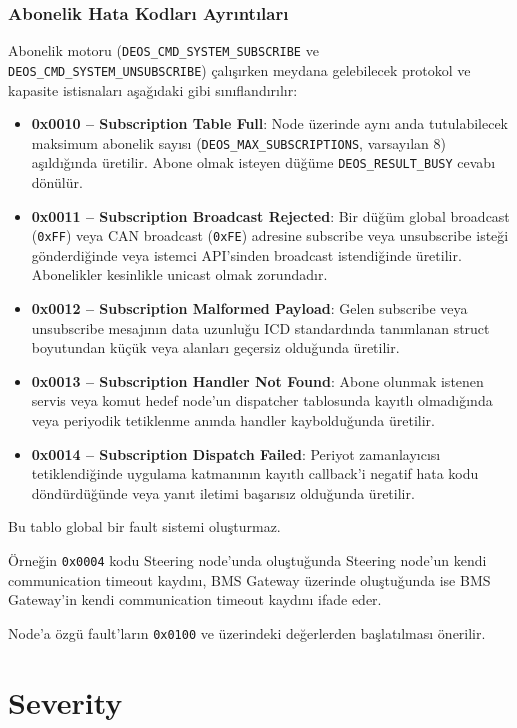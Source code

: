 \documentclass[a4paper,11pt]{article}
\newcommand{\hex}[1]{\texttt{0x#1}}
\begin{document}
\subsubsection{Abonelik Hata Kodları Ayrıntıları}

Abonelik motoru (\texttt{DEOS\_CMD\_SYSTEM\_SUBSCRIBE} ve \texttt{DEOS\_CMD\_SYSTEM\_UNSUBSCRIBE})
çalışırken meydana gelebilecek protokol ve kapasite istisnaları aşağıdaki gibi sınıflandırılır:

\begin{itemize}
    \item \textbf{0x0010 -- Subscription Table Full}: Node üzerinde aynı anda tutulabilecek maksimum abonelik sayısı (\texttt{DEOS\_MAX\_SUBSCRIPTIONS}, varsayılan 8) aşıldığında üretilir. Abone olmak isteyen düğüme \texttt{DEOS\_RESULT\_BUSY} cevabı dönülür.
    \item \textbf{0x0011 -- Subscription Broadcast Rejected}: Bir düğüm global broadcast (\hex{FF}) veya CAN broadcast (\hex{FE}) adresine subscribe veya unsubscribe isteği gönderdiğinde veya istemci API'sinden broadcast istendiğinde üretilir. Abonelikler kesinlikle unicast olmak zorundadır.
    \item \textbf{0x0012 -- Subscription Malformed Payload}: Gelen subscribe veya unsubscribe mesajının data uzunluğu ICD standardında tanımlanan struct boyutundan küçük veya alanları geçersiz olduğunda üretilir.
    \item \textbf{0x0013 -- Subscription Handler Not Found}: Abone olunmak istenen servis veya komut hedef node'un dispatcher tablosunda kayıtlı olmadığında veya periyodik tetiklenme anında handler kaybolduğunda üretilir.
    \item \textbf{0x0014 -- Subscription Dispatch Failed}: Periyot zamanlayıcısı tetiklendiğinde uygulama katmanının kayıtlı callback'i negatif hata kodu döndürdüğünde veya yanıt iletimi başarısız olduğunda üretilir.
\end{itemize}

Bu tablo global bir fault sistemi oluşturmaz.

Örneğin \texttt{0x0004} kodu Steering node'unda oluştuğunda
Steering node'un kendi communication timeout kaydını,
BMS Gateway üzerinde oluştuğunda ise BMS Gateway'in kendi
communication timeout kaydını ifade eder.

Node'a özgü fault'ların \texttt{0x0100} ve üzerindeki değerlerden
başlatılması önerilir.

\section{Severity}
\end{document}
